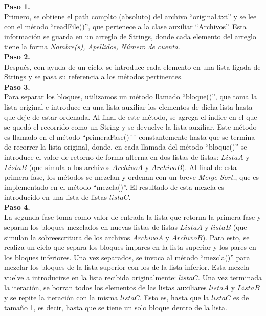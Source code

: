 \documentclass[12pt, letterpaper]{report}
\begin{document}
    \newpage
    
    \textbf{Paso 1.}\\
    Primero, se obtiene el path complto (absoluto) del archivo ``original.txt'' y se lee con el método ``readFile()'', que pertenece a la clase auxiliar ``Archivos''. Esta información se guarda en un arreglo de Strings, donde cada elemento del arreglo tiene la forma \textit{Nombre(s), Apellidos, Número de cuenta}.\\
    
    \textbf{Paso 2.}\\
    Después, con ayuda de un ciclo, se introduce cada elemento en una lista ligada de Strings y se pasa su referencia a los métodos pertinentes.\\
    
    \textbf{Paso 3.}\\
    Para separar los bloques, utilizamos un método llamado ``bloque()'', que toma la lista original e introduce en una lista auxiliar los elementos de dicha lista hasta que deje de estar ordenada. Al final de este método, se agrega el índice en el que se quedó el recorrido como un String y se devuelve la lista auxiliar. Este método es llamado en el método ``primeraFase()´´ constantemente hasta que se termina de recorrer la lista original, donde, en cada llamada del método ``bloque()'' se introduce el valor de retorno de forma alterna en dos listas de listas: $ListaA$ y $ListaB$ (que simula a los archivos $ArchivoA$ y $ArchivoB$). Al final de esta primera fase, los métodos se mezclan y ordenan con un breve \textit{Merge Sort.}, que es implementado en el método ``mezcla()''. El resultado de esta mezcla es introducido en una lista de listas $listaC$.\\
    
    \textbf{Paso 4.}\\
    La segunda fase toma como valor de entrada la lista que retorna la primera fase y separan los bloques mezclados en nuevas listas de listas $ListaA$ y $listaB$ (que simulan la sobreescritura de los archivos $ArchivoA$ y $ArchivoB$). Para esto, se realiza un ciclo que separa los bloques impares en la lista superior y los pares en los bloques inferiores. Una vez separados, se invoca al método ``mezcla()'' para mezclar los bloques de la lista superior con los de la lista inferior. Esta mezcla vuelve a introducirse en la lista recibida originalmente: $listaC$. Una vez terminada la iteración, se borran todos los elementos de las listas auxiliares $listaA$ y $ListaB$ y se repite la iteración con la misma $listaC$. Esto es, hasta que la $listaC$ es de tamaño 1, es decir, hasta que se tiene un solo bloque dentro de la lista.\\
    
\end{document}
